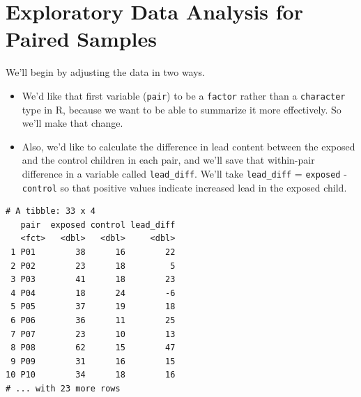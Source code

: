 \documentclass[
]{book}
\newenvironment{Shaded}{\begin{snugshade}}{\end{snugshade}}
\newcommand{\DataTypeTok}[1]{\textcolor[rgb]{0.13,0.29,0.53}{#1}}
\newcommand{\KeywordTok}[1]{\textcolor[rgb]{0.13,0.29,0.53}{\textbf{#1}}}
\newcommand{\NormalTok}[1]{#1}
\newcommand{\OperatorTok}[1]{\textcolor[rgb]{0.81,0.36,0.00}{\textbf{#1}}}
\newcommand{\StringTok}[1]{\textcolor[rgb]{0.31,0.60,0.02}{#1}}
\providecommand{\tightlist}{%
  \setlength{\itemsep}{0pt}\setlength{\parskip}{0pt}}
\begin{document}
\hypertarget{exploratory-data-analysis-for-paired-samples}{%
\section{Exploratory Data Analysis for Paired Samples}\label{exploratory-data-analysis-for-paired-samples}}

We'll begin by adjusting the data in two ways.

\begin{itemize}
\tightlist
\item
  We'd like that first variable (\texttt{pair}) to be a \texttt{factor} rather than a \texttt{character} type in R, because we want to be able to summarize it more effectively. So we'll make that change.
\item
  Also, we'd like to calculate the difference in lead content between the exposed and the control children in each pair, and we'll save that within-pair difference in a variable called \texttt{lead\_diff}. We'll take \texttt{lead\_diff} = \texttt{exposed} - \texttt{control} so that positive values indicate increased lead in the exposed child.
\end{itemize}

\begin{Shaded}
\end{Shaded}

\begin{verbatim}
# A tibble: 33 x 4
   pair  exposed control lead_diff
   <fct>   <dbl>   <dbl>     <dbl>
 1 P01        38      16        22
 2 P02        23      18         5
 3 P03        41      18        23
 4 P04        18      24        -6
 5 P05        37      19        18
 6 P06        36      11        25
 7 P07        23      10        13
 8 P08        62      15        47
 9 P09        31      16        15
10 P10        34      18        16
# ... with 23 more rows
\end{verbatim}
\end{document}
